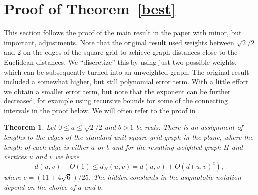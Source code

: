 \documentclass[12pt]{article}
\theoremstyle{plain}
\newtheorem{theorem}{Theorem}
\theoremstyle{definition}
\theoremstyle{remark}
\begin{document}
\section{Proof of Theorem~\ref{best}}\label{sec6}
This section follows the proof of the main result in the paper \cite{CaC26} with minor, but important, adjustments. Note that the original result used weights between $\sqrt2/2$ and $2$ on the edges of the square grid to achieve graph distances close to the Euclidean distances. We ``discretize'' this by using just two possible weights, which can be subsequently turned into an unweighted graph. The original result included a somewhat higher, but still polynomial error term. With a little effort we obtain a smaller error term, but note that the exponent can be further decreased, for example using recursive bounds for some of the connecting intervals in the proof below. We will often refer to the proof in \cite{CaC26}.

\begin{theorem}\label{ab}
Let $0\le a\le\sqrt2/2$ and $b>1$ be reals. There is an assignment of lengths to the edges of the standard unit square grid graph in the plane, where the length of each edge is either $a$ or $b$ and for the resulting weighted graph $H$ and vertices $u$ and $v$ we have
$$d(u,v)-O(1)\le d_H(u,v)=d(u,v)+O(d(u,v)^c),$$
where $c=(11+4\sqrt6)/25$. The hidden constants in the asymptotic notation depend on the choice of $a$ and $b$.
\end{theorem}
\end{document}
